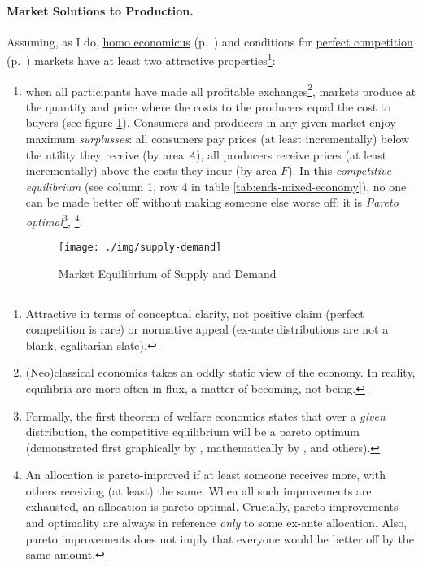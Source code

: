 \paragraph{Market Solutions to Production.}  \label{sec:market-solutions-production} Assuming, as I do, \hyperref[it:homoeconomicus]{homo economicus} (p.~\pageref{it:homoeconomicus})  and conditions for \hyperref[sec:perfect-competition]{perfect competition} (p.~\pageref{sec:perfect-competition}) markets have at least two attractive properties\footnote
	{Attractive in terms of conceptual clarity, not positive claim (perfect competition is rare) or normative appeal (ex-ante distributions are not a blank, egalitarian slate).}:
\begin{enumerate}
	\item when all  participants have made all profitable exchanges\footnote
		{(Neo)classical economics takes an oddly static view of the economy. In reality, equilibria are more often in flux, a matter of becoming, not being.},
	markets produce at the quantity and price where the costs to the producers equal the cost to buyers (see figure \ref{fig:supply-demand}). Consumers and producers in any given market enjoy maximum \emph{surplusses}: all consumers pay prices (at least incrementally) below the utility they receive (by area $A$), all producers receive prices (at least incrementally) above the costs they incur (by area $F$). In this \emph{competitive equilibrium} (see column 1, row 4 in table \ref{tab:ends-mixed-economy}), no one can be made better off without making someone else worse off: it is \emph{Pareto optimal}\footnote{
		\label{fn:1sttheorem} Formally, the first theorem of welfare economics states that over a \emph{given} distribution, the competitive equilibrium will be a pareto optimum (demonstrated first graphically by \cite{Lerner1944}, mathematically by \cite{Lange1934}, \cite{Debreu1954} and others).},
		\footnote{An allocation is pareto-improved if at least someone receives more, with others receiving (at least) the same. When all such improvements are exhausted, an allocation is pareto optimal. Crucially, pareto improvements and optimality are always in reference \emph{only} to some ex-ante allocation. Also, pareto improvements does not imply that everyone would be better off by the same amount.}.
	\begin{figure}[htbp]
		\centering
		\texttt{[image: ./img/supply-demand]}
		\caption{Market Equilibrium of Supply and Demand}
		\label{fig:supply-demand}
	\end{figure}

\end{enumerate}
